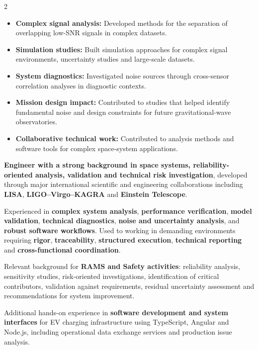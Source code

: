 \documentclass[8pt,a4paper,ragged2e,withhyper]{altacv}
\begin{document}
\begin{paracol}{2}
\begin{itemize}
\item \textbf{Complex signal analysis:} Developed methods for the separation of overlapping low-SNR signals in complex datasets.
\item \textbf{Simulation studies:} Built simulation approaches for complex signal environments, uncertainty studies and large-scale datasets.
\item \textbf{System diagnostics:} Investigated noise sources through cross-sensor correlation analyses in diagnostic contexts.
\item \textbf{Mission design impact:} Contributed to studies that helped identify fundamental noise and design constraints for future gravitational-wave observatories.
\item \textbf{Collaborative technical work:} Contributed to analysis methods and software tools for complex space-system applications.
\end{itemize}

\switchcolumn


\textbf{Engineer with a strong background in space systems, reliability-oriented analysis, validation and technical risk investigation}, developed through major international scientific and engineering collaborations including \textbf{LISA}, \textbf{LIGO--Virgo--KAGRA} and \textbf{Einstein Telescope}.

Experienced in \textbf{complex system analysis}, \textbf{performance verification}, \textbf{model validation}, \textbf{technical diagnostics}, \textbf{noise and uncertainty analysis}, and \textbf{robust software workflows}. Used to working in demanding environments requiring \textbf{rigor}, \textbf{traceability}, \textbf{structured execution}, \textbf{technical reporting} and \textbf{cross-functional coordination}.

Relevant background for \textbf{RAMS and Safety activities}: reliability analysis, sensitivity studies, risk-oriented investigations, identification of critical contributors, validation against requirements, residual uncertainty assessment and recommendations for system improvement.

Additional hands-on experience in \textbf{software development and system interfaces} for EV charging infrastructure using TypeScript, Angular and Node.js, including operational data exchange services and production issue analysis.



\end{paracol}
\end{document}
